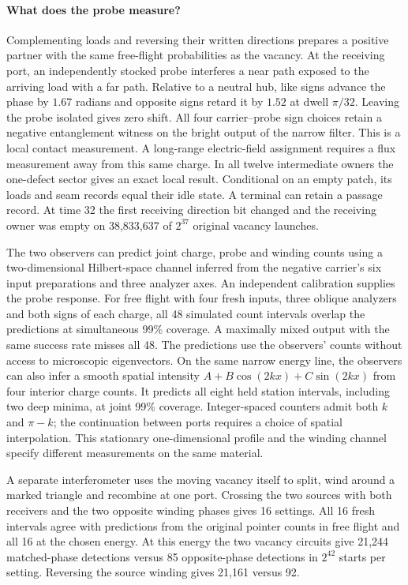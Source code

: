 \paragraph{What does the probe measure?}
Complementing loads and reversing their written directions prepares a
positive partner with the same free-flight probabilities as the vacancy.
At the receiving port, an independently stocked probe interferes a near
path exposed to the arriving load with a far path. Relative to a neutral
hub, like signs advance the phase by $1.67$ radians and opposite signs
retard it by $1.52$ at dwell $\pi/32$. Leaving the probe isolated gives
zero shift. All four carrier--probe sign choices retain a negative
entanglement witness on the bright output of the narrow filter. This is
a local contact measurement. A long-range electric-field assignment requires a flux measurement away
from this same charge. In all twelve intermediate owners the one-defect
sector gives an exact local result. Conditional on an empty patch, its
loads and seam records equal their idle state. A terminal can retain
a passage record. At time 32 the first receiving direction bit changed
and the receiving owner was empty on 38,833,637 of $2^{37}$ original
vacancy launches.

The two observers can predict joint charge, probe and winding counts
using a two-dimensional Hilbert-space channel inferred from the negative
carrier's six input preparations and three analyzer axes. An independent
calibration supplies the probe response. For free flight with four fresh
inputs, three oblique analyzers and both signs of each charge, all 48
simulated count intervals overlap the predictions at simultaneous 99\%
coverage. A maximally mixed output with the same success rate misses all 48. The predictions use the observers' counts
without access to microscopic eigenvectors. On the same narrow energy line,
the observers can also infer a smooth spatial intensity
$A+B\cos(2kx)+C\sin(2kx)$ from four interior charge counts. It predicts
all eight held station intervals, including two deep minima, at joint
99\% coverage. Integer-spaced counters admit both $k$ and $\pi-k$;
the continuation between ports requires a choice of spatial interpolation.
This stationary one-dimensional profile and the winding channel specify
different measurements on the same material.

A separate interferometer uses the moving vacancy itself to split,
wind around a marked triangle and recombine at one port. Crossing the
two sources with both receivers and the two opposite winding phases gives
16 settings. All 16 fresh intervals agree with predictions from the
original pointer counts in free flight and all 16 at the chosen energy.
At this energy the two vacancy circuits give 21,244 matched-phase
detections versus 85 opposite-phase detections in $2^{42}$ starts per
setting. Reversing the source winding gives 21,161 versus 92.

